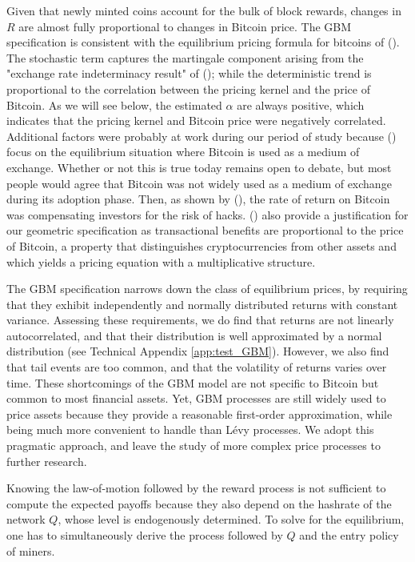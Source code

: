 \documentclass[12pt, a4paper]{article}
\begin{document}
Given that newly minted coins account for the bulk of block rewards, changes in $R$ are almost fully proportional to changes in Bitcoin price.
The GBM specification is consistent with the equilibrium pricing formula for bitcoins of \citeauthor{Schilling} (\citeyear{Schilling}). The stochastic term captures the martingale
component arising from the "exchange rate indeterminacy result" of \citeauthor{kareken} (\citeyear{kareken}); while the deterministic trend is proportional
to the correlation between the pricing kernel and the price of Bitcoin. As we will see below, the estimated $\alpha$ are always positive, which indicates that
the pricing kernel and Bitcoin price were negatively correlated. Additional factors were probably at work during our period of study because \citeauthor{Schilling} (\citeyear{Schilling}) focus on the equilibrium situation where Bitcoin is used as a medium of exchange. Whether or not this is true today remains open to debate,
but most people would agree that Bitcoin was not widely used as a medium of exchange during its adoption phase. Then, as shown by \citeauthor{Biais2018} (\citeyear{Biais2018}),
the rate of return on Bitcoin was compensating investors for the risk of hacks. \citeauthor{Biais2018} (\citeyear{Biais2018}) also provide a justification for our geometric specification as transactional benefits are proportional to the price of Bitcoin, a property that distinguishes cryptocurrencies from other assets and which
yields a pricing equation with a multiplicative structure.

The GBM specification narrows down the class of equilibrium prices, by requiring that they exhibit independently and normally distributed returns with constant variance.
Assessing these requirements, we do find that returns are not linearly autocorrelated, and that their distribution is well approximated by a normal distribution (see Technical Appendix \ref{app:test_GBM}). However, we also find that tail events are too common, and that the volatility of returns varies over time. These shortcomings of the GBM model are not specific to Bitcoin but common to most financial assets. Yet, GBM processes are still widely used to price assets because they provide a reasonable first-order approximation, while being much more convenient to handle than L\'{e}vy processes. We adopt this pragmatic approach, and leave the study of more complex price processes to further research.


Knowing the law-of-motion followed by the reward process is not sufficient to
compute the expected payoffs because they also depend on the
hashrate of the network $Q$, whose level is endogenously determined. To
solve for the equilibrium, one has to simultaneously derive the process
followed by $Q$ and the entry policy of miners.
\end{document}
